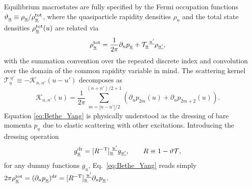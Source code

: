 \documentclass[
twocolumn,
amsfonts,
showpacs,
superscriptaddress,
amsmath,
amssymb,
aps,
longbibliography,
prl,
noeprint
]{revtex4-2}
\newcommand{\1}{{\bf 1}}
\begin{document}
Equilibrium macrostates are fully specified by the Fermi occupation functions $\vartheta_{\underline{u}}\equiv \rho_{\underline{u}}/\rho^{\rm tot}_{\underline{u}}$, where the quasiparticle rapidity densities $\rho_{\underline{u}}$ and the total state densities $\rho^{\rm tot}_{\underline{u}}(u)$ are related via
\begin{equation}\label{eq:Bethe_Yang}
    \rho^{\rm tot}_{\underline{u}}=\frac{1}{2\pi}\partial_{u} p_{\underline{u}}+
    \mathcal{T}_{\underline{u}}^{~\underline{u'}}\rho_{\underline{u'}},
\end{equation}
with the summation convention over the repeated discrete index and convolution over the domain of the common rapidity variable in mind.
The scattering kernel $\mathcal{T}_{\underline{u}}^{~\underline{u'}}\equiv -\mathcal{K}_{n,n'}(u-u')$ decomposes as
\begin{equation}
    \mathcal{K}_{n,n'}(u)=\frac{1}{2\pi}\sum_{m=|n-n'|/2}^{(n+n')/2+1}\!(\partial_{u}p_{2m}(u)+\partial_{u}p_{2m+2}(u)).
\end{equation}
Equation \eqref{eq:Bethe_Yang} is physically understood as the dressing of bare momenta $p_{\underline{u}}$ due to elastic scattering with other excitations. Introducing the dressing operation
\begin{equation}
    g_{\underline{u}}^{\rm dr} = [R^{-\mathrm{T}}]_{\underline{u}}^{~\underline{u'}}g_{\underline{u'}},\qquad R \equiv 1-\vartheta\mathcal{T},
\end{equation}
for any dummy functions $g_{\underline{u}}$, Eq.~\eqref{eq:Bethe_Yang} reads simply $2\pi\rho^{\rm tot}_{\underline{u}}=(\partial_{u}p_{\underline{u}})^{\rm dr}=[R^{-\mathrm{T}}]_{\underline{u}}^{~\underline{u'}}\partial_{u}p_{\underline{u}}$.
\end{document}
